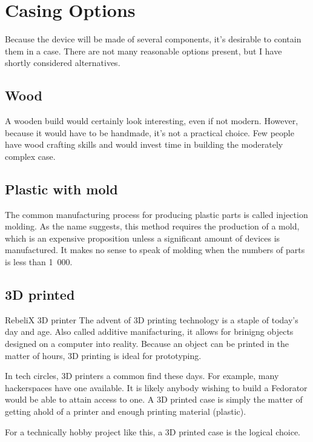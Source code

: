     \section{Casing Options}
        Because the device will be made of several components, it's desirable to contain them in a case.  There are not many reasonable options present, but I have shortly considered alternatives.
        \subsection{Wood}
            A wooden build would certainly look interesting, even if not modern.  However, because it would have to be handmade, it's not a practical choice.  Few people have wood crafting skills and would invest time in building the moderately complex case.
        
        \subsection{Plastic with mold}
            The common manufacturing process for producing plastic parts is called injection molding.  As the name suggests, this method requires the production of a mold, which is an expensive proposition unless a significant amount of devices is manufactured.  It makes no sense to speak of molding when the numbers of parts is less than 1~000\cite{rexplastics-mold-price}.
            
        \subsection{3D printed}
                {RebeliX 3D printer\cite{rebelix-photo}}
            The advent of 3D printing technology is a staple of today's day and age.  Also called additive manifacturing, it allows for brinigng objects designed on a computer into reality.  Because an object can be printed in the matter of hours, 3D printing is ideal for prototyping.
            
            In tech circles, 3D printers a common find these days.  For example, many hackerspaces have one available\cite{hackerspaces-3d-printers}. It is likely anybody wishing to build a Fedorator would be able to attain access to one.  A 3D printed case is simply the matter of getting ahold of a printer and enough printing material (plastic).
            
            For a technically hobby project like this, a 3D printed case is the logical choice.
            
